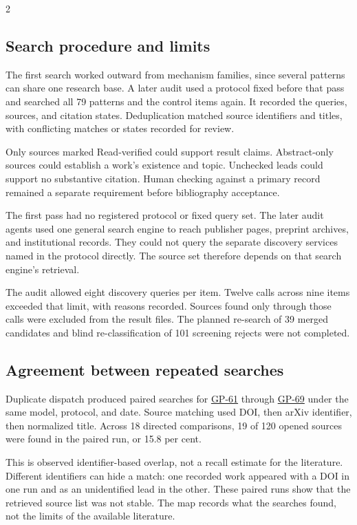 \begin{multicols}{2}
\subsection{Search procedure and limits}

The first search worked outward from mechanism families, since several patterns can share one research base. A later audit used a protocol fixed before that pass and searched all 79 patterns and the control items again. It recorded the queries, sources, and citation states. Deduplication matched source identifiers and titles, with conflicting matches or states recorded for review.

Only sources marked Read-verified could support result claims. Abstract-only sources could establish a work's existence and topic. Unchecked leads could support no substantive citation. Human checking against a primary record remained a separate requirement before bibliography acceptance.

The first pass had no registered protocol or fixed query set. The later audit agents used one general search engine to reach publisher pages, preprint archives, and institutional records. They could not query the separate discovery services named in the protocol directly. The source set therefore depends on that search engine's retrieval.

The audit allowed eight discovery queries per item. Twelve calls across nine items exceeded that limit, with reasons recorded. Sources found only through those calls were excluded from the result files. The planned re-search of 39 merged candidates and blind re-classification of 101 screening rejects were not completed.

\subsection{Agreement between repeated searches}

Duplicate dispatch produced paired searches for \hyperlink{gp-61}{GP-61} through \hyperlink{gp-69}{GP-69} under the same model, protocol, and date. Source matching used DOI, then arXiv identifier, then normalized title. Across 18 directed comparisons, 19 of 120 opened sources were found in the paired run, or 15.8 per cent.

This is observed identifier-based overlap, not a recall estimate for the literature. Different identifiers can hide a match: one recorded work appeared with a DOI in one run and as an unidentified lead in the other. These paired runs show that the retrieved source list was not stable. The map records what the searches found, not the limits of the available literature.


\end{multicols}
